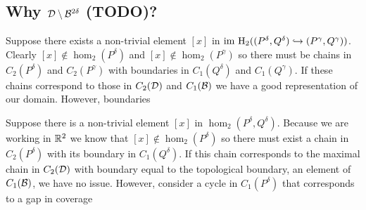 %
%
%
%
%

\subsection{Why ${\mathcal{D}}\setminus{\mathcal{B}}^{2\delta}$ (TODO)?}

Suppose there exists a non-trivial element $[x]$ in $\mathrm{im}~\mathrm{H}_2((P^\delta, Q^\delta)\hookrightarrow (P^\gamma, Q^\gamma))$.
Clearly $[x]\notin\hom_2(P^\delta)$ and $[x]\notin\hom_2(P^\gamma)$ so there must be chains in $C_2(P^\delta)$ and $C_2(P^\gamma)$ with boundaries in $C_1(Q^\delta)$ and $C_1(Q^\gamma)$.
If these chains correspond to those in $C_2({\mathcal{D}})$ and $C_1({\mathcal{B}})$ we have a good representation of our domain.
However, boundaries

Suppose there is a non-trivial element $[x]$ in $\hom_2(P^\delta, Q^\delta)$.
Because we are working in $\mathbb{R}^2$ we know that $[x]\notin \hom_2(P^\delta)$ so there must exist a chain in $C_2(P^\delta)$ with its boundary in $C_1(Q^\delta)$.
If this chain corresponds to the maximal chain in $C_2({\mathcal{D}})$ with boundary equal to the topological boundary, an element of $C_1({\mathcal{B}})$, we have no issue.
However, consider a cycle in $C_1(P^\delta)$ that corresponds to a gap in coverage



